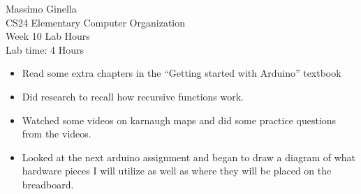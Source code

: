 \documentclass[12pt]{article}
\begin{document}
	\begin{center}
		Massimo Ginella \\
		CS24 Elementary Computer Organization \\
		Week 10 Lab Hours \\
		Lab time: 4 Hours \vspace{0.5cm} \\
	\end{center}
	
	\begin{itemize}
		\item Read some extra chapters in the ``Getting started with Arduino'' textbook
		\item Did research to recall how recursive functions work.
		\item Watched some videos on karnaugh maps and did some practice questions from the videos.
		\item Looked at the next arduino assignment and began to draw a diagram of what hardware pieces I will utilize as well as where they will be placed on the breadboard.
	\end{itemize}
	
	
	
\end{document}
